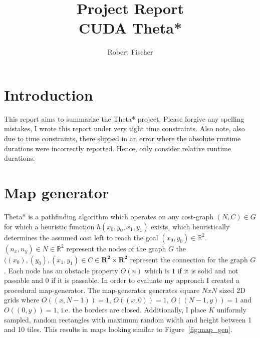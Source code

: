 \documentclass{article}
\title{Project Report \\ CUDA Theta*}
\author{Robert Fischer }
\begin{document}
\maketitle

\section{Introduction}
%
This report aims to summarize the Theta* project. Please forgive any spelling mistakes, I wrote this report under very tight time constraints. Also note, also due to time constraints, there slipped in an error where the absolute runtime durations were incorrectly reported. Hence, only consider relative runtime durations.
%
\section{Map generator}
%
Theta* is a pathfinding algorithm which operates on any cost-graph $(N, C) \in G$ for which a heuristic function $h(x_0,y_0,x_1,y_1)$ exists, which heuristically determines the assumed cost left to reach the goal $(x_0,y_0) \in \mathbb{R}^2$. $(n_x, n_y) \in N \in \mathbb{R}^2$ represent the nodes of the graph $G$ the  $((x_0), (y_0), (x_1, y_1) \in C \in \mathbf{R^2}\times\mathbf{R^2}$ represent the connection for the graph $G$. Each node has an obstacle property $O(n)$ which is $1$ if it is solid and not passable and $0$ if it is passable. In order to evaluate my approach I created a procedural map-generator. The map-generator generates square $NxN$ sized 2D grids where $O((x,N - 1))=1$, $O((x,0))=1$, $O((N - 1,y))=1$ and $O((0,y))=1$, i.e. the borders are closed. Additionally, I place $K$ uniformly sampled, random rectangles with maximum random width and height between 1 and 10 tiles. This results in maps looking similar to Figure~\ref{fig:map_gen}.
%
\end{document}
